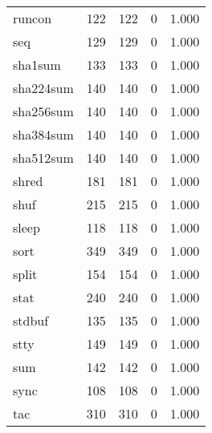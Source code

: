 \begin{longtable}{lp{3.0cm}p{3.0cm}p{3.0cm}p{3.0cm}}
runcon    &                     122 &              122 &                 0 &                        1.000 \\
seq       &                     129 &              129 &                 0 &                        1.000 \\
sha1sum   &                     133 &              133 &                 0 &                        1.000 \\
sha224sum &                     140 &              140 &                 0 &                        1.000 \\
sha256sum &                     140 &              140 &                 0 &                        1.000 \\
sha384sum &                     140 &              140 &                 0 &                        1.000 \\
sha512sum &                     140 &              140 &                 0 &                        1.000 \\
shred     &                     181 &              181 &                 0 &                        1.000 \\
shuf      &                     215 &              215 &                 0 &                        1.000 \\
sleep     &                     118 &              118 &                 0 &                        1.000 \\
sort      &                     349 &              349 &                 0 &                        1.000 \\
split     &                     154 &              154 &                 0 &                        1.000 \\
stat      &                     240 &              240 &                 0 &                        1.000 \\
stdbuf    &                     135 &              135 &                 0 &                        1.000 \\
stty      &                     149 &              149 &                 0 &                        1.000 \\
sum       &                     142 &              142 &                 0 &                        1.000 \\
sync      &                     108 &              108 &                 0 &                        1.000 \\
tac       &                     310 &              310 &                 0 &                        1.000 \\

\end{longtable}
